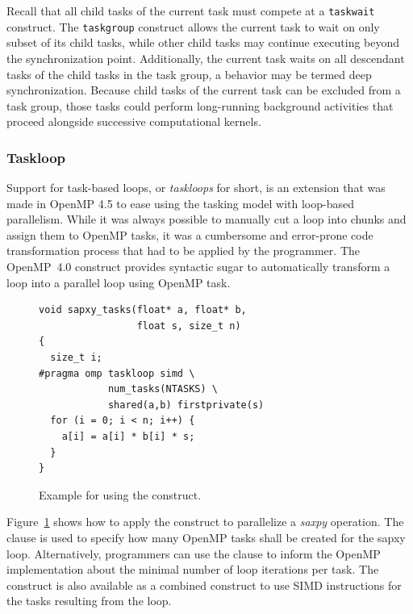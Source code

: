 

Recall that all child tasks of the current task must compete at a \texttt{taskwait} construct.  The \texttt{taskgroup} construct allows the current task to wait on only subset of its child tasks, while other child tasks may continue executing beyond the synchronization point.  Additionally, the current task waits on all descendant tasks of the child tasks in the task group, a behavior may be termed deep synchronization.  Because child tasks of the current task can be excluded from a task group, those tasks could perform long-running background activities that proceed alongside successive computational kernels.






\subsubsection{Taskloop}
\label{sec:Taskloop}

Support for task-based loops, or \emph{taskloops} for short, is  an extension that was made in OpenMP 4.5 to ease using the tasking model with loop-based parallelism.
While it was always possible to manually cut a loop into chunks and assign them to OpenMP tasks, it was a cumbersome and error-prone code transformation process that had to be applied by the programmer.
The OpenMP~4.0  construct provides syntactic sugar to automatically transform a loop into a parallel loop using OpenMP task.

\begin{figure}
\begin{verbatim}
void sapxy_tasks(float* a, float* b,
                 float s, size_t n)
{
  size_t i;
#pragma omp taskloop simd \
            num_tasks(NTASKS) \
            shared(a,b) firstprivate(s)
  for (i = 0; i < n; i++) {
    a[i] = a[i] * b[i] * s;
  }
}
\end{verbatim}
\caption{Example for using the  construct.\label{fig:TaskloopExample}}
\end{figure}

Figure~\ref{fig:TaskloopExample} shows how to apply the  construct to parallelize a \emph{saxpy} operation.
The  clause is used to specify how many OpenMP tasks shall be created for the sapxy loop.
Alternatively, programmers can use the \code{grainsize} clause to inform the OpenMP implementation about the minimal number of loop iterations per task.
The \code{taskloop} construct is also available as a combined construct to use SIMD instructions for the tasks resulting from the loop.
